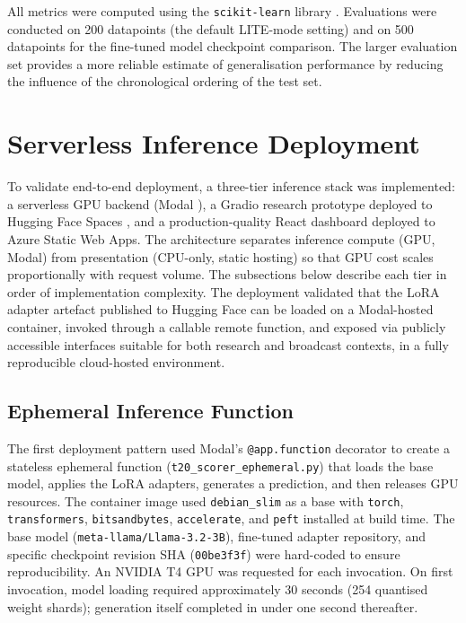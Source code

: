 All metrics were computed using the \texttt{scikit-learn} library \cite{pedregosa2011scikit}. Evaluations were conducted on 200 datapoints (the default LITE-mode setting) and on 500 datapoints for the fine-tuned model checkpoint comparison. The larger evaluation set provides a more reliable estimate of generalisation performance by reducing the influence of the chronological ordering of the test set.

\section{Serverless Inference Deployment}

To validate end-to-end deployment, a three-tier inference stack was implemented: a serverless GPU backend (Modal \cite{modal2024}), a Gradio research prototype deployed to Hugging Face Spaces \cite{hfspaces2024}, and a production-quality React dashboard deployed to Azure Static Web Apps. The architecture separates inference compute (GPU, Modal) from presentation (CPU-only, static hosting) so that GPU cost scales proportionally with request volume. The subsections below describe each tier in order of implementation complexity. The deployment validated that the LoRA adapter artefact published to Hugging Face can be loaded on a Modal-hosted container, invoked through a callable remote function, and exposed via publicly accessible interfaces suitable for both research and broadcast contexts, in a fully reproducible cloud-hosted environment.

\subsection{Ephemeral Inference Function}

The first deployment pattern used Modal's \texttt{@app.function} decorator to create a stateless ephemeral function (\texttt{t20\_scorer\_ephemeral.py}) that loads the base model, applies the LoRA adapters, generates a prediction, and then releases GPU resources. The container image used \texttt{debian\_slim} as a base with \texttt{torch}, \texttt{transformers}, \texttt{bitsandbytes}, \texttt{accelerate}, and \texttt{peft} installed at build time. The base model (\texttt{meta-llama/Llama-3.2-3B}), fine-tuned adapter repository, and specific checkpoint revision SHA (\texttt{00be3f3f}) were hard-coded to ensure reproducibility. An NVIDIA T4 GPU was requested for each invocation. On first invocation, model loading required approximately 30 seconds (254 quantised weight shards); generation itself completed in under one second thereafter.

